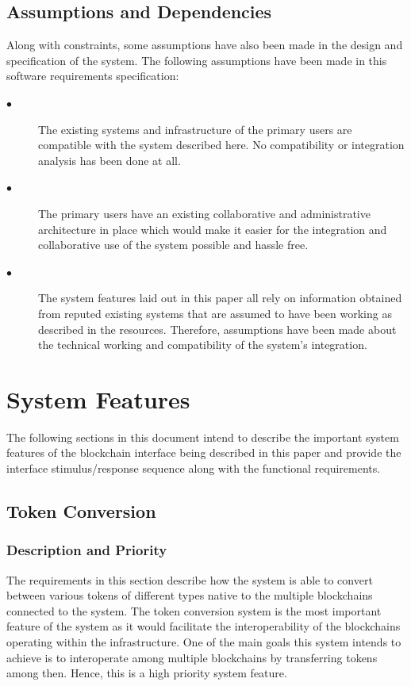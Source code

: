 \documentclass[a4paper,twoside,phd]{BYUPhys}
\begin{document}
\subsection{Assumptions and Dependencies}
Along with constraints, some assumptions have also been made in the design and specification of the system. The following assumptions have been made in this software requirements specification:
\begin{description}
\item[$\bullet$] The existing systems and infrastructure of the primary users are compatible with the system described here. No compatibility or integration analysis has been done at all.
\item[$\bullet$] The primary users have an existing collaborative and administrative architecture in place which would make it easier for the integration and collaborative use of the system possible and hassle free.
\item[$\bullet$]  The system features laid out in this paper all rely on information obtained from reputed existing systems that are assumed to have been working as described in the resources. Therefore, assumptions have been made about the technical working and compatibility of the system's integration.
\end{description}
\section{System Features \label{sect:chap2sysmodel}}
The following sections in this document intend to describe the important system features of the blockchain interface being described in this paper and provide the interface stimulus/response sequence along with the functional requirements.
\subsection{Token Conversion}
\subsubsection{Description and Priority}
The requirements in this section describe how the system is able to convert between various tokens of different types native to the multiple blockchains connected to the system. The token conversion system is the most important feature of the system as it would facilitate the interoperability of the blockchains operating within the infrastructure. One of the main goals this system intends to achieve is to interoperate among multiple blockchains by transferring tokens among then. Hence, this is a high priority system feature.
\end{document}
